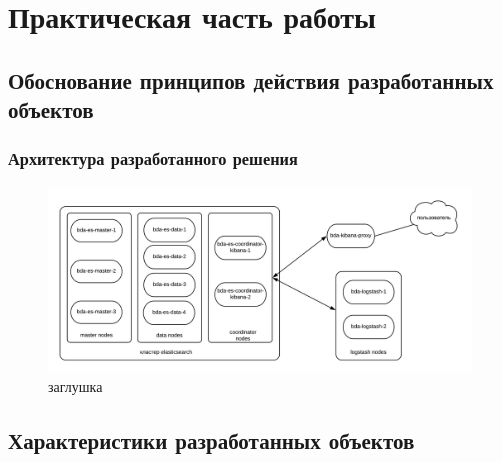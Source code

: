 \chapter{Практическая часть работы}
\section{Обоснование принципов действия разработанных объектов}
\subsection{Архитектура разработанного решения}
\begin{figure}[h]
    \centering
    \includegraphics{../images/mock2.png}
    \caption{заглушка}
\end{figure}

\section{Характеристики разработанных объектов}
